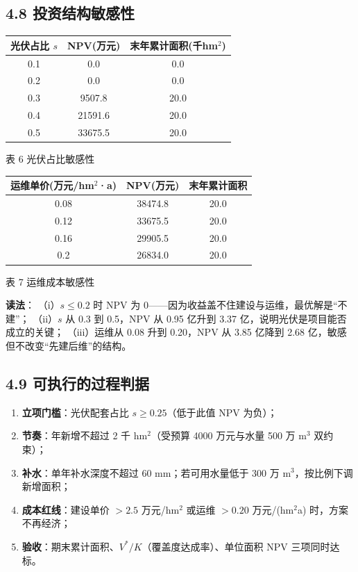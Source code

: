 \documentclass[11pt,a4paper]{ctexart}
\begin{document}
\subsection*{4.8 投资结构敏感性}
\begin{table}[H]\centering\small
\begin{tabular}{|c|c|c|}
\toprule
光伏占比 $s$ & NPV(万元) & 末年累计面积(千hm$^2$) \\
\midrule
0.1 & 0.0 & 0.0 \\
0.2 & 0.0 & 0.0 \\
0.3 & 9507.8 & 20.0 \\
0.4 & 21591.6 & 20.0 \\
0.5 & 33675.5 & 20.0 \\
\bottomrule
\end{tabular}
\begin{center}\small 表 6  光伏占比敏感性\end{center}
\end{table}\begin{table}[H]\centering\small
\begin{tabular}{|c|c|c|}
\toprule
运维单价(万元/hm$^2$·a) & NPV(万元) & 末年累计面积 \\
\midrule
0.08 & 38474.8 & 20.0 \\
0.12 & 33675.5 & 20.0 \\
0.16 & 29905.5 & 20.0 \\
0.2 & 26834.0 & 20.0 \\
\bottomrule
\end{tabular}
\begin{center}\small 表 7  运维成本敏感性\end{center}
\end{table}
\textbf{读法}：
（i）$s\le0.2$ 时 NPV 为 0——因为收益盖不住建设与运维，最优解是“不建”；
（ii）$s$ 从 0.3 到 0.5，NPV 从 0.95 亿升到 3.37 亿，说明光伏是项目能否成立的关键；
（iii）运维从 0.08 升到 0.20，NPV 从 3.85 亿降到 2.68 亿，敏感但不改变“先建后维”的结构。

\subsection*{4.9 可执行的过程判据}
\begin{enumerate}
\item \textbf{立项门槛}：光伏配套占比 $s\ge0.25$（低于此值 NPV 为负）；
\item \textbf{节奏}：年新增不超过 2 千 hm$^2$（受预算 4000 万元与水量 500 万 m$^3$ 双约束）；
\item \textbf{补水}：单年补水深度不超过 60 mm；若可用水量低于 300 万 m$^3$，按比例下调新增面积；
\item \textbf{成本红线}：建设单价 $>2.5$ 万元/hm$^2$ 或运维 $>0.20$ 万元/(hm$^2$a) 时，方案不再经济；
\item \textbf{验收}：期末累计面积、$V^*/K$（覆盖度达成率）、单位面积 NPV 三项同时达标。
\end{enumerate}
\end{document}
